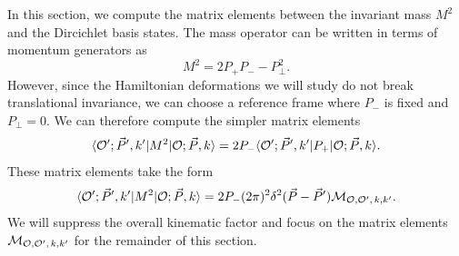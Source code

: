 \begin{subappendices}
In this section, we compute the matrix elements between the invariant mass $M^2$ 
and the Dircichlet basis states. The mass operator can be written in terms of 
momentum generators as 
\begin{equation}
    M^2 = 2P_+ P_- - P_\bot^2.
\end{equation} 
However, since the Hamiltonian deformations we will study do not break 
translational invariance, we can choose a reference frame where $P_-$ is fixed 
and $P_\bot = 0$. We can therefore compute the simpler matrix elements 
\begin{equation}
    \langle \mathcal{O}'; \vec{P}', k'| M^2 |\mathcal{O}; \vec{P}, k\rangle = 2P_- \langle \mathcal{O}'; \vec{P}', k'| P_+ |{\cal O}; \vec{P}, k\rangle.
\end{equation} 
These matrix elements take the form 
\begin{equation}
    \begin{aligned}
        \langle \mathcal{O}'; \vec{P}', k'| M^2 |\mathcal{O}; \vec{P}, k\rangle = 2P_- (2\pi)^2 \delta^2(\vec{P}- \vec{P}') {{\cal M}}_{\mathcal{O},\mathcal{O}', \, k, k'}.
    \end{aligned}
\end{equation} 
We will suppress the overall kinematic factor and focus on the matrix elements 
$ {\cal M}_{\mathcal{O},\mathcal{O}', \, k, k'}$ for the remainder of this section.


\end{subappendices}
